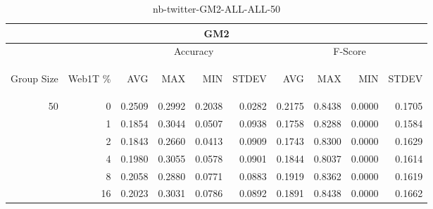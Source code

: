 \begin{center}
\begin{table}[htbp]
\begin{tabular}{ | r | r | r | r | r | r | r | r | r | r |}
\hline
\multicolumn{10}{|c|}{GM2}\\
\hline
 & & \multicolumn{4}{|c|}{Accuracy} & \multicolumn{4}{|c|}{F-Score}\\ \cline{3-10}
\begin{sideways}Group Size\end{sideways} & \begin{sideways}Web1T \%\end{sideways} & \begin{sideways}AVG\end{sideways} & \begin{sideways}MAX\end{sideways} & \begin{sideways}MIN\end{sideways} & \begin{sideways}STDEV\end{sideways} & \begin{sideways}AVG\end{sideways} & \begin{sideways}MAX\end{sideways} & \begin{sideways}MIN\end{sideways} & \begin{sideways}STDEV\end{sideways}\\
\hline
\multirow{5}{*}{50}
 & 0 & 0.2509 & 0.2992 & 0.2038 & 0.0282 & 0.2175 & 0.8438 & 0.0000 & 0.1705\\ \cline{2-10}
 & 1 & 0.1854 & 0.3044 & 0.0507 & 0.0938 & 0.1758 & 0.8288 & 0.0000 & 0.1584\\ \cline{2-10}
 & 2 & 0.1843 & 0.2660 & 0.0413 & 0.0909 & 0.1743 & 0.8300 & 0.0000 & 0.1629\\ \cline{2-10}
 & 4 & 0.1980 & 0.3055 & 0.0578 & 0.0901 & 0.1844 & 0.8037 & 0.0000 & 0.1614\\ \cline{2-10}
 & 8 & 0.2058 & 0.2880 & 0.0771 & 0.0883 & 0.1919 & 0.8362 & 0.0000 & 0.1619\\ \cline{2-10}
 & 16 & 0.2023 & 0.3031 & 0.0786 & 0.0892 & 0.1891 & 0.8438 & 0.0000 & 0.1662\\ \cline{2-10}
\hline
\end{tabular}
\caption{nb-twitter-GM2-ALL-ALL-50}
\label{table:nb-twitter-GM2-ALL-ALL-50}
\end{table}
\end{center}

